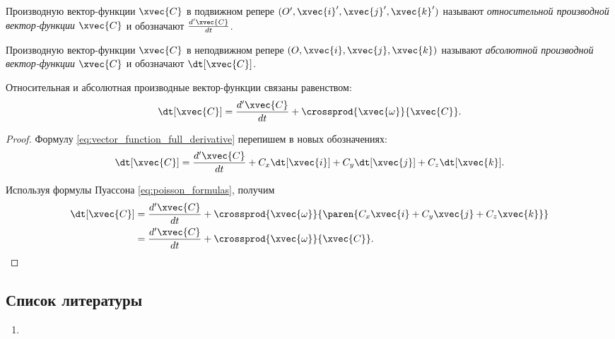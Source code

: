 \begin{definition}
  Производную вектор-функции $\xvec{C}$ в подвижном репере $(O', \xvec{i}',
  \xvec{j}', \xvec{k}')$ называют \textit{относительной производной
  вектор-функции $\xvec{C}$} и обозначают $\frac{d' \xvec{C}}{dt}$.
\end{definition}

\begin{definition}
  Производную вектор-функции $\xvec{C}$ в неподвижном репере $(O, \xvec{i},
  \xvec{j}, \xvec{k})$ называют \textit{абсолютной производной вектор-функции
  $\xvec{C}$} и обозначают $\dt[\xvec{C}]$.
\end{definition}

\begin{theorem}
  \label{theorem:relative_derivative}
  Относительная и абсолютная производные вектор-функции связаны равенством:
  \begin{equation}
  \label{eq:relative_derivative}
    \dt[\xvec{C}] = \frac{d' \xvec{C}}{dt} +
      \crossprod{\xvec{\omega}}{\xvec{C}}.
  \end{equation}
\end{theorem}

\begin{proof}
  Формулу \ref{eq:vector_function_full_derivative} перепишем в новых
  обозначениях:
  \begin{equation*}
    \dt[\xvec{C}] = \frac{d' \xvec{C}}{dt}
      + C_x \dt[\xvec{i}] + C_y \dt[\xvec{j}] + C_z \dt[\xvec{k}].
  \end{equation*}
  
  Используя формулы Пуассона \ref{eq:poisson_formulas}, получим
  \begin{equation*}
    \begin{aligned}
      \dt[\xvec{C}] &= \frac{d' \xvec{C}}{dt}
        + \crossprod
          {\xvec{\omega}}
          {\paren{C_x \xvec{i} + C_y \xvec{j} + C_z \xvec{k}}} \\
      &= \frac{d' \xvec{C}}{dt} + \crossprod{\xvec{\omega}}{\xvec{C}}.
    \end{aligned}
  \end{equation*}
\end{proof}

\subsection{Список литературы}
\begin{enumerate}
  \item \cite{lectures}
\end{enumerate}

